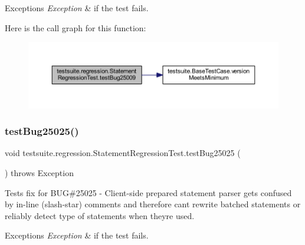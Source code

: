 \begin{DoxyExceptions}{Exceptions}
{\em Exception} & if the test fails. \\
\hline
\end{DoxyExceptions}
Here is the call graph for this function\+:
\nopagebreak
\begin{figure}[H]
\begin{center}
\leavevmode
\includegraphics[width=350pt]{classtestsuite_1_1regression_1_1_statement_regression_test_a857b7ade8c7c4e47bd7f0c8340d91386_cgraph}
\end{center}
\end{figure}
\mbox{\label{classtestsuite_1_1regression_1_1_statement_regression_test_ae15552bf551f9a8b5b291264142f57ae}} 
\subsubsection{\texorpdfstring{test\+Bug25025()}{testBug25025()}}
{\footnotesize\ttfamily void testsuite.\+regression.\+Statement\+Regression\+Test.\+test\+Bug25025 (\begin{DoxyParamCaption}{ }\end{DoxyParamCaption}) throws Exception}

Tests fix for B\+UG\#25025 -\/ Client-\/side prepared statement parser gets confused by in-\/line (slash-\/star) comments and therefore can\textquotesingle{}t rewrite batched statements or reliably detect type of statements when they\textquotesingle{}re used.


\begin{DoxyExceptions}{Exceptions}
{\em Exception} & if the test fails. \\
\hline
\end{DoxyExceptions}
\mbox{\label{classtestsuite_1_1regression_1_1_statement_regression_test_a67cdc2b43a1d7ac490ee30dd639ebd48}} 
